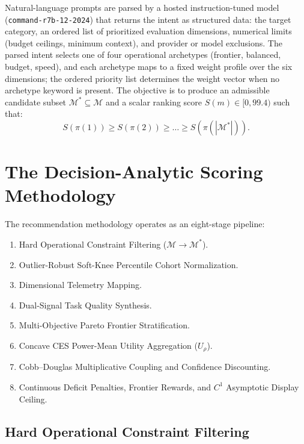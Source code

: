 \documentclass[pdflatex,sn-mathphys-num]{sn-jnl}
\theoremstyle{thmstyleone}
\theoremstyle{thmstylethree}
\begin{document}
Natural-language prompts are parsed by a hosted instruction-tuned model (\texttt{command-r7b-12-2024}) that returns the intent as structured data: the target category, an ordered list of prioritized evaluation dimensions, numerical limits (budget ceilings, minimum context), and provider or model exclusions. The parsed intent selects one of four operational archetypes (frontier, balanced, budget, speed), and each archetype maps to a fixed weight profile over the six dimensions; the ordered priority list determines the weight vector when no archetype keyword is present. The objective is to produce an admissible candidate subset $\mathcal{M}^* \subseteq \mathcal{M}$ and a scalar ranking score $S(m) \in [0, 99.4)$ such that:
\begin{equation}\label{eq:objective}
S(\pi(1)) \ge S(\pi(2)) \ge \dots \ge S(\pi(|\mathcal{M}^*|)).
\end{equation}

\section{The Decision-Analytic Scoring Methodology}\label{sec:methodology}

The recommendation methodology operates as an eight-stage pipeline:
\begin{enumerate}
  \item Hard Operational Constraint Filtering ($\mathcal{M} \to \mathcal{M}^*$).
  \item Outlier-Robust Soft-Knee Percentile Cohort Normalization.
  \item Dimensional Telemetry Mapping.
  \item Dual-Signal Task Quality Synthesis.
  \item Multi-Objective Pareto Frontier Stratification.
  \item Concave CES Power-Mean Utility Aggregation ($U_\rho$).
  \item Cobb--Douglas Multiplicative Coupling and Confidence Discounting.
  \item Continuous Deficit Penalties, Frontier Rewards, and $C^1$ Asymptotic Display Ceiling.
\end{enumerate}

\subsection{Hard Operational Constraint Filtering}\label{subsec:filtering}
\end{document}
